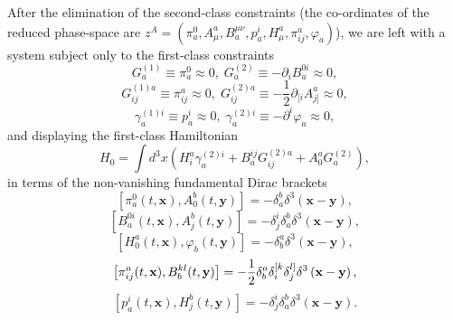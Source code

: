 \documentclass[a4paper,12pt]{article}
\begin{document}
After the elimination of the second-class constraints (the co-ordinates of
the reduced phase-space are $z^{A}=\left( \pi _{a}^{0},A_{\mu
}^{a},B_{a}^{\mu \nu },p_{a}^{i},H_{\mu }^{a},\pi _{ij}^{a},\varphi
_{a}\right) $), we are left with a system subject only to the first-class
constraints 
\begin{equation}
G_{a}^{(1)}\equiv \pi _{a}^{0}\approx 0,\;G_{a}^{(2)}\equiv -\partial
_{i}B_{a}^{0i}\approx 0,  \label{xx2}
\end{equation}
\begin{equation}
G_{ij}^{(1)a}\equiv \pi _{ij}^{a}\approx 0,\;G_{ij}^{(2)a}\equiv -\frac{1}{2}%
\partial _{[i}A_{j]}^{a}\approx 0,  \label{xx3}
\end{equation}
\begin{equation}
\gamma _{a}^{(1)i}\equiv p_{a}^{i}\approx 0,\;\gamma _{a}^{(2)i}\equiv
-\partial ^{i}\varphi _{a}\approx 0,  \label{xx4}
\end{equation}
and displaying the first-class Hamiltonian 
\begin{equation}
H_{0}=\int d^{3}x\left( H_{i}^{a}\gamma
_{a}^{(2)i}+B_{a}^{ij}G_{ij}^{(2)a}+A_{0}^{a}G_{a}^{(2)}\right) ,
\label{xx5}
\end{equation}
in terms of the non-vanishing fundamental Dirac brackets 
\begin{equation}
\left[ \pi _{a}^{0}(t,\mathbf{x}),A_{0}^{b}(t,\mathbf{y})\right] =-\delta
_{a}^{b}\delta ^{3}\left( \mathbf{x}-\mathbf{y}\right) ,  \label{xx6}
\end{equation}
\begin{equation}
\left[ B_{a}^{0i}(t,\mathbf{x}),A_{j}^{b}(t,\mathbf{y})\right] =-\delta
_{j}^{i}\delta _{a}^{b}\delta ^{3}\left( \mathbf{x}-\mathbf{y}\right) ,
\label{xx7}
\end{equation}
\begin{equation}
\left[ H_{0}^{a}(t,\mathbf{x}),\varphi _{b}(t,\mathbf{y})\right] =-\delta
_{b}^{a}\delta ^{3}\left( \mathbf{x}-\mathbf{y}\right) ,  \label{xx8}
\end{equation}
\begin{equation}
\left[ \pi _{ij}^{a}(t,\mathbf{x}),B_{b}^{kl}(t,\mathbf{y})\right] =-\frac{1%
}{2}\delta _{b}^{a}\delta _{i}^{[k}\delta _{j}^{l]}\delta ^{3}\left( \mathbf{%
x}-\mathbf{y}\right) ,  \label{xx9}
\end{equation}
\begin{equation}
\left[ p_{a}^{i}(t,\mathbf{x}),H_{j}^{b}(t,\mathbf{y})\right] =-\delta
_{j}^{i}\delta _{a}^{b}\delta ^{3}\left( \mathbf{x}-\mathbf{y}\right) .
\label{xx10}
\end{equation}
\end{document}
